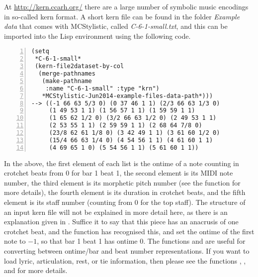 At \href{http://kern.ccarh.org/}{http://kern.ccarh.org/} there are a large number of symbolic music encodings in so-called kern format. A short kern file can be found in the 
folder \emph{Example data} that comes with MCStylistic, called \emph{C-6-1-small.txt}, and this can be imported into the Lisp environment using the following code.
\begin{Verbatim}[frame=single,numbers=left]
(setq
 *C-6-1-small*
 (kern-file2dataset-by-col
  (merge-pathnames
   (make-pathname
    :name "C-6-1-small" :type "krn")
   *MCStylistic-Jun2014-example-files-data-path*)))
--> ((-1 66 63 5/3 0) (0 37 46 1 1) (2/3 66 63 1/3 0)
     (1 49 53 1 1) (1 56 57 1 1) (1 59 59 1 1)
     (1 65 62 1/2 0) (3/2 66 63 1/2 0) (2 49 53 1 1)
     (2 53 55 1 1) (2 59 59 1 1) (2 68 64 7/8 0)
     (23/8 62 61 1/8 0) (3 42 49 1 1) (3 61 60 1/2 0)
     (15/4 66 63 1/4 0) (4 54 56 1 1) (4 61 60 1 1)
     (4 69 65 1 0) (5 54 56 1 1) (5 61 60 1 1))
\end{Verbatim}
In the above, the first element of each list is the ontime of a note counting in crotchet beats from 0 for bar 1 beat 1, the second element is its MIDI note number, the third element is its morphetic pitch number (see the function  for more details), the fourth element is its duration in crotchet beats, and the fifth element is its staff number (counting from 0 for the top staff). The structure of an input kern file will not be explained in more detail here, as there is an explanation given in \citet[][Appendix B.2.3]{collins2011b}. Suffice it to say that this piece has an anacrusis of one crotchet beat, and the function  has recognised this, and set the ontime of the first note to $-1$, so that bar 1 beat 1 has ontime 0. The functions  and  are useful for converting between ontime/bar and beat number representations. If you want to load lyric, articulation, rest, or tie information, then please see the functions , , and  for more details.


